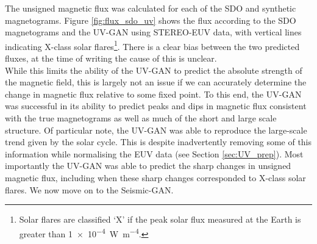 \documentclass[11pt,a4paper,onecolumn]{report}
\begin{document}
The unsigned magnetic flux was calculated for each of the SDO and synthetic
magnetograms. Figure \ref{fig:flux_sdo_uv} shows the flux according to the SDO
magnetograms and the UV-GAN using STEREO-EUV data, with vertical lines
indicating X-class solar flares\footnote{Solar flares are classified `X' if the
peak solar flux measured at the Earth is greater than \SI{1e-4}{W.m^{-4}}.}.
There is a clear bias between the two predicted fluxes, at
the time of writing the cause of this is unclear.\\

While this limits the ability of the UV-GAN to predict the absolute strength of
the magnetic field, this is largely not an issue if we can accurately determine
the change in magnetic flux relative to some fixed point.
To this end, the UV-GAN was successful in its ability to predict peaks and dips
in magnetic flux consistent with the true magnetograms as well as much of the
short and large scale structure. Of particular note, the UV-GAN was able to
reproduce the large-scale trend given by the solar cycle. This is despite
inadvertently removing some of this information while normalising the EUV data
(see Section \ref{sec:UV_prep}). Most importantly the UV-GAN was able to predict
the sharp changes in unsigned magnetic flux, including when these sharp changes
corresponded to X-class solar flares. We now move on to the Seismic-GAN. 
\end{document}
